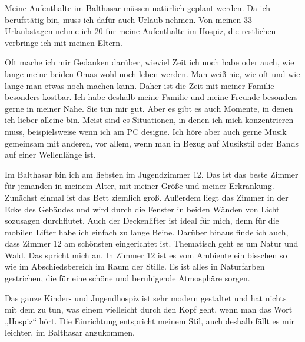 \documentclass[fontsize=14pt,a4paper,headinclude,DIV=calc,automark]{scrbook}
\begin{document}
Meine Aufenthalte im Balthasar müssen natürlich geplant werden. Da ich berufstätig bin, muss ich dafür auch Urlaub nehmen. Von meinen 33 Urlaubstagen nehme ich 20 für meine Aufenthalte im Hospiz, die restlichen verbringe ich mit meinen Eltern.

Oft mache ich mir Gedanken darüber, wieviel Zeit ich noch habe oder auch, wie lange meine beiden Omas wohl noch leben werden. Man weiß nie, wie oft und wie lange man etwas noch machen kann. Daher ist die Zeit mit meiner Familie besonders kostbar. Ich habe deshalb meine Familie und meine Freunde besonders gerne in meiner Nähe. Sie tun mir gut. Aber es gibt es auch Momente, in denen ich lieber alleine bin. Meist sind es Situationen, in denen ich mich konzentrieren muss, beispielsweise wenn ich am PC designe. Ich höre aber auch gerne Musik gemeinsam mit anderen, vor allem, wenn man in Bezug auf Musikstil oder Bands auf einer Wellenlänge ist.

Im Balthasar bin ich am liebsten im Jugendzimmer 12. Das ist das beste Zimmer für jemanden in meinem Alter, mit meiner Größe und meiner Erkrankung. Zunächst einmal ist das Bett ziemlich groß. Außerdem liegt das Zimmer in der Ecke des Gebäudes und wird durch die Fenster in beiden Wänden von Licht sozusagen durchflutet. Auch der Deckenlifter ist ideal für mich, denn für die mobilen Lifter habe ich einfach zu lange Beine. Darüber hinaus finde ich auch, dass Zimmer 12 am schönsten eingerichtet ist. Thematisch geht es um Natur und Wald. Das spricht mich an. In Zimmer 12 ist es vom Ambiente ein bisschen so wie im Abschiedsbereich im Raum der Stille. Es ist alles in Naturfarben gestrichen, die für eine schöne und beruhigende Atmosphäre sorgen.

Das ganze Kinder- und Jugendhospiz ist sehr modern gestaltet und hat nichts mit dem zu tun, was einem vielleicht durch den Kopf geht, wenn man das Wort „Hospiz“ hört. Die Einrichtung entspricht meinem Stil, auch deshalb fällt es mir leichter, im Balthasar anzukommen.
\end{document}
